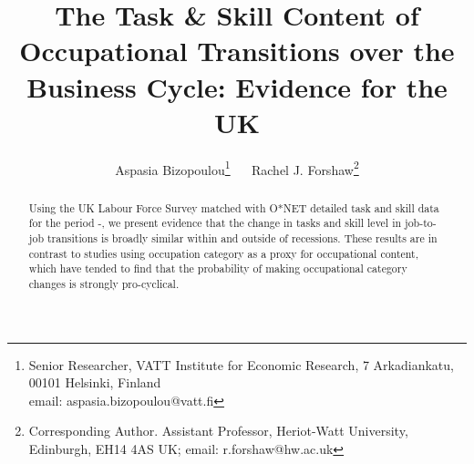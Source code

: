 \documentclass[11pt, oneside]{article}
\begin{document}
	



		
	\author{Aspasia Bizopoulou\footnote{Senior Researcher, VATT Institute for Economic Research, 7 Arkadiankatu, 00101 Helsinki, Finland\\ email: aspasia.bizopoulou@vatt.fi} $\quad$ Rachel J. Forshaw\footnote{Corresponding Author. Assistant Professor, Heriot-Watt University, Edinburgh, EH14 4AS UK; email: r.forshaw@hw.ac.uk}} 
	\title{\textbf{The Task \& Skill Content of Occupational Transitions over the Business Cycle: Evidence for the UK}}

	
	\maketitle
	
	\vspace{-5mm}
	
	\begin{abstract}
		
		Using the UK Labour Force Survey matched with O*NET detailed task and skill data for the period \hspace{-1mm}-\hspace{-1mm}, we present evidence that the change in tasks and skill level in job-to-job transitions is broadly similar within and outside of recessions. These results are in contrast to studies using occupation category as a proxy for occupational content, which have tended to find that the probability of making occupational category changes is strongly pro-cyclical. 

	
	

		
	\end{abstract}
\end{document}
